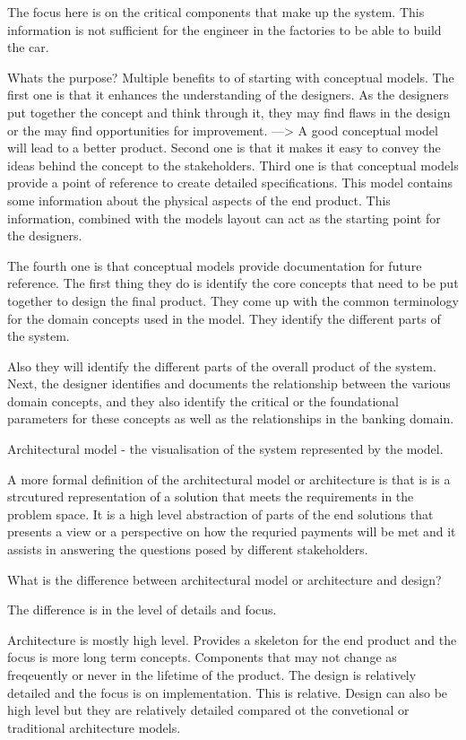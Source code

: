 The focus here is on the critical components that make up the system.
This information is not sufficient for the engineer in the factories to be able to build the car.

Whats the purpose?
Multiple benefits to of starting with conceptual models.
The first one is that it enhances the understanding of the designers.
As the designers put together the concept and think through it, they may find flaws in the design or the may find opportunities for improvement.
---> A good conceptual model will lead to a better product.
Second one is that it makes it easy to convey the ideas behind the concept to the stakeholders.
Third one is that conceptual models provide a point of reference to create detailed specifications.
This model contains some information about the physical aspects of the end product.
This information, combined with the models layout can act as the starting point for the designers.

The fourth one is that conceptual models provide documentation for future reference.
The first thing they do is identify the core concepts that need to be put together to design the final product.
They come up with the common terminology for the domain concepts used in the model.
They identify the different parts of the system.

Also they will identify the different parts of the overall product of the system.
Next, the designer identifies and documents the relationship between the various domain concepts, and they also identify the critical or the foundational parameters for these concepts as well as the relationships in the banking domain.

Architectural model - the visualisation of the system represented by the model.

A more formal definition of the architectural model or architecture is that is is a strcutured representation of a solution that meets the requirements in the problem space.
It is a high level abstraction of parts of the end solutions that presents a view or a perspective on how the requried payments will be met and it assists in answering the questions posed by different stakeholders.

What is the difference between architectural model or architecture and design?

The difference is in the level of details and focus.

Architecture is mostly high level.
Provides a skeleton for the end product and the focus is more long term concepts. Components that may not change as freqeuently or never in the lifetime of the product.
The design is relatively detailed and the focus is on implementation.
This is relative. Design can also be high level but they are relatively detailed compared ot the convetional or traditional architecture models.

